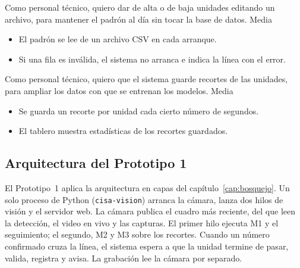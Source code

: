   {Como personal técnico, quiero dar de alta o de baja unidades editando un
   archivo, para mantener el padrón al día sin tocar la base de datos.}
  {Media}
  {\begin{itemize}[nosep,leftmargin=*]
     \item El padrón se lee de un archivo CSV en cada arranque.
     \item Si una fila es inválida, el sistema no arranca e indica la
           línea con el error.
   \end{itemize}}

  {Como personal técnico, quiero que el sistema guarde recortes de las
   unidades, para ampliar los datos con que se entrenan los modelos.}
  {Media}
  {\begin{itemize}[nosep,leftmargin=*]
     \item Se guarda un recorte por unidad cada cierto número de segundos.
     \item El tablero muestra estadísticas de los recortes guardados.
   \end{itemize}}

\subsection{Arquitectura del Prototipo 1}

El Prototipo~1 aplica la arquitectura en capas del
capítulo~\ref{cap:bosquejo}. Un solo proceso de Python
(\texttt{cisa-vision}) arranca la cámara, lanza dos hilos de visión y el
servidor web. La cámara publica el cuadro más reciente, del que leen la
detección, el video en vivo y las capturas. El primer hilo ejecuta M1 y el
seguimiento; el segundo, M2 y M3 sobre los recortes. Cuando un número
confirmado cruza la línea, el sistema espera a que la unidad termine de
pasar, valida, registra y avisa. La grabación lee la cámara por separado.

